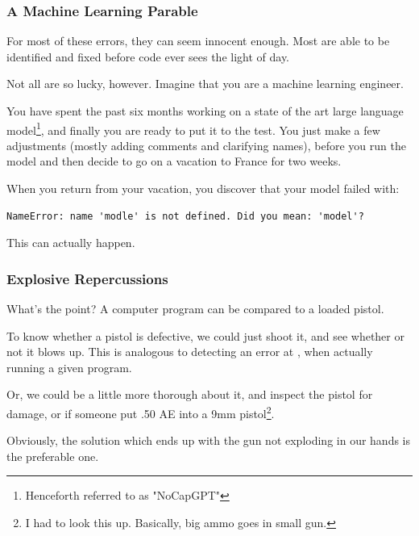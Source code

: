 \documentclass[aspectratio=169, handout]{beamer}
\begin{document}
\begin{frame}[fragile]
  \frametitle{A Machine Learning Parable}

  For most of these errors, they can seem innocent enough. Most are able to be
  identified and fixed before code ever sees the light of day.

  \pause
  \vspace{\fill}

  Not all are so lucky, however. Imagine that you are a machine learning engineer.

  \pause
  \vspace{\fill}

  You have spent the past six months working on a state of the art large
  language model\footnote{Henceforth referred to as "NoCapGPT"}, and finally you are ready to put it to the test. You just
  make a few adjustments (mostly adding comments and clarifying names),
  before you run the model and then decide to go on a vacation to France for
  two weeks.

  \pause
  \vspace{\fill}

  When you return from your vacation, you discover that your model failed
  with:
  {\small
  \begin{lstlisting}[style=15150code, numbers=none]
    NameError: name 'modle' is not defined. Did you mean: 'model'?
  \end{lstlisting}
  }

  \pause
  \vspace{\fill}

  This can actually happen.
\end{frame}

\begin{frame}[fragile]
  \frametitle{Explosive Repercussions}

  What's the point? A computer program can be compared to a loaded pistol.

  \pause
  \vspace{\fill}

  To know whether a pistol is defective, we could just shoot it, and see whether
  or not it blows up. This is analogous to detecting an error at ,
  when actually running a given program.

  \pause
  \vspace{\fill}

  Or, we could be a little more thorough about it, and inspect the pistol for
  damage, or if someone put .50 AE into a 9mm pistol\footnote{I had to look this
  up. Basically, big ammo goes in small gun.}.

  \pause
  \vspace{\fill}

  Obviously, the solution which ends up with the gun not exploding in our hands is
  the preferable one.
\end{frame}
\end{document}
